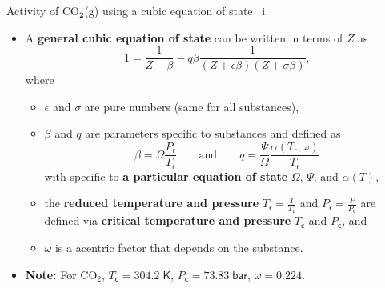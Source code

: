 \begin{frame}{Activity of CO$_{\boldsymbol{2}}$(g) using a cubic equation of state \, i}

\begin{itemize}
\item A \alert{\textbf{general cubic equation of state}} can be written in terms
of $Z$ \citep{Smith2005} as
\[
\boxed{1=\frac{1}{Z-\beta}-q\beta\frac{1}{(Z+\epsilon\beta)(Z+\sigma\beta)}},
\]
where  
\begin{itemize}
\item $\epsilon$ and $\sigma$ are pure numbers (same for all substances),  
\item $\beta$ and $q$ are  parameters specific to substances and defined as
\[
\beta=\Omega\frac{P_{\mathsf{r}}}{T_{\mathsf{r}}} \qquad \mbox{and} \qquad
q=\frac{\Psi}{\Omega}\frac{\alpha(T_{\mathsf{r}},\omega)}{T_{\mathsf{r}}}
\]
%
with specific to \textbf{a particular equation of state} $\Omega$, $\Psi$, and $\alpha(T)$, 
\item the \textbf{reduced temperature and pressure} $T_{\mathsf{r}} = \frac{T}{T_{\mathsf{c}}}$ and
$P_{\mathsf{r}} = \frac{P}{P_{\mathsf{c}}}$ are defined via \textbf{critical temperature and pressure} 
$T_{\mathsf{c}}$ and $P_{\mathsf{c}}$, and 
\item $\omega$ is a \alert{acentric factor} that depends on the substance.
\end{itemize}
%
\item \textbf{Note:} For CO$_{2}$, ${T_{\mathsf{c}}=304.2\;\mathsf{K}}$, ${P_{\mathsf{c}}=73.83\;\mathsf{bar}}$,
${\omega=0.224}$. 
\end{itemize}

\end{frame}
%
